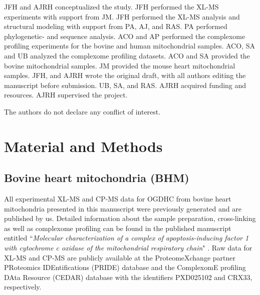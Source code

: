 \documentclass[times, twoside]{zHenriquesLab-StyleBioRxiv}
\begin{document}
\begin{contributions}
JFH and AJRH conceptualized the study. JFH performed the XL-MS experiments with support from JM. JFH performed the XL-MS analysis and structural modeling with support from PA, AJ, and RAS. PA performed phylogenetic- and sequence analysis. ACO and AP performed the complexome profiling experiments for the bovine and human mitochondrial samples. ACO, SA and UB analyzed the complexome profiling datasets. ACO and SA provided the bovine mitochondrial samples. JM provided the mouse heart mitochondrial samples. JFH, and AJRH wrote the original draft, with all authors editing the manuscript before submission. UB, SA, and RAS. AJRH acquired funding and resources. AJRH supervised the project.
\end{contributions}

\begin{interests}
The authors do not declare any conflict of interest.
\end{interests}

\newpage

\section*{Material and Methods}
\subsection*{Bovine heart mitochondria (BHM)}
All experimental XL-MS and CP-MS data for OGDHC from bovine heart mitochondria presented in this manuscript were previously generated and are published by us. Detailed information about the sample preparation, cross-linking as well as complexome profiling can be found in the published manuscript entitled “\emph{Molecular characterization of a complex of apoptosis-inducing factor 1 with cytochrome c oxidase of the mitochondrial respiratory chain}" \cite{Hevler_2021b}. Raw data for XL-MS and CP-MS are publicly available at the ProteomeXchange partner PRoteomics IDEntifications (PRIDE) database and the ComplexomE profiling DAta Resource (CEDAR) database with the identifiers PXD025102 and CRX33, respectively.
\end{document}
